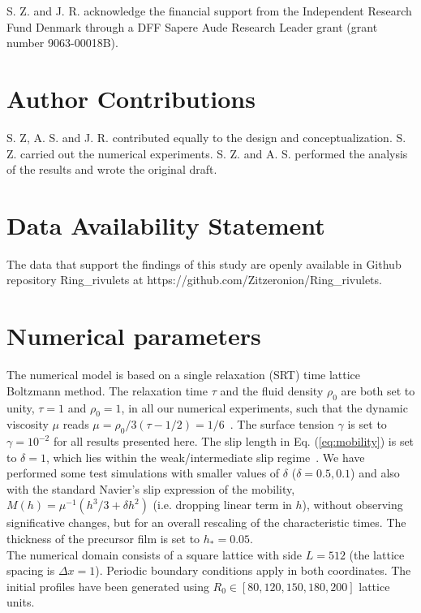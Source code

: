 \documentclass[%
 aip,
 amsmath,amssymb,
 reprint,%
]{revtex4-1}
\begin{document}
\begin{acknowledgments}
S. Z. and J. R. acknowledge the financial support from the Independent Research Fund Denmark through a DFF Sapere Aude Research Leader grant (grant number 9063-00018B).
\end{acknowledgments}

\section*{Author Contributions}
S. Z, A. S. and J. R.  contributed equally to the design and conceptualization. S. Z. carried out the numerical experiments. S. Z. and A. S. performed the analysis of the results and wrote the original draft. 

\section*{Data Availability Statement}

The data that support the findings of this study are openly available in Github repository Ring\_rivulets at https://github.com/Zitzeronion/Ring\_rivulets.

\appendix

\section{Numerical parameters}\label{app:numerics}
The numerical model is based on a single relaxation (SRT) time lattice Boltzmann method. 
The relaxation time $\tau$ and the fluid density $\rho_0$ are both set to unity, $\tau = 1$ and $\rho_0=1$, 
in all our numerical experiments, such that the dynamic viscosity $\mu$ reads $\mu = \rho_0/3 (\tau-1/2) = 1/6$~\cite{zitzLatticeBoltzmannMethod2019}.
The surface tension $\gamma$ is set to $\gamma = 10^{-2}$ for all results presented here.
The slip length in Eq. (\ref{eq:mobility}) is set to $\delta = 1$, which lies within the weak/intermediate slip regime~\cite{peschkaSignaturesSlipDewetting2019,fetzerQuantifyingHydrodynamicSlip2007, munchLubricationModelsSmall2005}. 
We have performed some test simulations with smaller values of $\delta$ ($\delta = 0.5, 0.1$) and also with the standard Navier's slip expression of the mobility, $M(h) = \mu^{-1}(h^3/3 + \delta h^2)$ (i.e. dropping linear term in $h$), without observing significative changes, but for an overall rescaling of the characteristic times.
The thickness of the precursor film is set to $h_{\ast} = 0.05$.\\
The numerical domain consists of a square lattice with side $L=512$ (the lattice spacing is $\Delta x =1$). 
Periodic boundary conditions apply in both coordinates.
The initial profiles have been generated using $R_0\in[80, 120, 150, 180, 200]$ lattice units.
\end{document}
